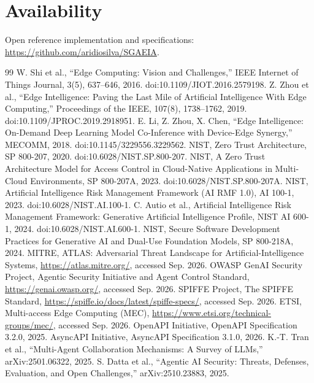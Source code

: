 \documentclass[11pt]{article}
\newcommand{\repo}{\url{https://github.com/aridiosilva/SGAEIA}}
\begin{document}
\section*{Availability}
Open reference implementation and specifications: \repo.
\begin{thebibliography}{99}
 W. Shi et al., ``Edge Computing: Vision and Challenges,'' IEEE Internet of Things Journal, 3(5), 637--646, 2016. doi:10.1109/JIOT.2016.2579198.
 Z. Zhou et al., ``Edge Intelligence: Paving the Last Mile of Artificial Intelligence With Edge Computing,'' Proceedings of the IEEE, 107(8), 1738--1762, 2019. doi:10.1109/JPROC.2019.2918951.
 E. Li, Z. Zhou, X. Chen, ``Edge Intelligence: On-Demand Deep Learning Model Co-Inference with Device-Edge Synergy,'' MECOMM, 2018. doi:10.1145/3229556.3229562.
 NIST, Zero Trust Architecture, SP 800-207, 2020. doi:10.6028/NIST.SP.800-207.
 NIST, A Zero Trust Architecture Model for Access Control in Cloud-Native Applications in Multi-Cloud Environments, SP 800-207A, 2023. doi:10.6028/NIST.SP.800-207A.
 NIST, Artificial Intelligence Risk Management Framework (AI RMF 1.0), AI 100-1, 2023. doi:10.6028/NIST.AI.100-1.
 C. Autio et al., Artificial Intelligence Risk Management Framework: Generative Artificial Intelligence Profile, NIST AI 600-1, 2024. doi:10.6028/NIST.AI.600-1.
 NIST, Secure Software Development Practices for Generative AI and Dual-Use Foundation Models, SP 800-218A, 2024.
 MITRE, ATLAS: Adversarial Threat Landscape for Artificial-Intelligence Systems, \url{https://atlas.mitre.org/}, accessed Sep. 2026.
 OWASP GenAI Security Project, Agentic Security Initiative and Agent Control Standard, \url{https://genai.owasp.org/}, accessed Sep. 2026.
 SPIFFE Project, The SPIFFE Standard, \url{https://spiffe.io/docs/latest/spiffe-specs/}, accessed Sep. 2026.
 ETSI, Multi-access Edge Computing (MEC), \url{https://www.etsi.org/technical-groups/mec/}, accessed Sep. 2026.
 OpenAPI Initiative, OpenAPI Specification 3.2.0, 2025.
 AsyncAPI Initiative, AsyncAPI Specification 3.1.0, 2026.
 K.-T. Tran et al., ``Multi-Agent Collaboration Mechanisms: A Survey of LLMs,'' arXiv:2501.06322, 2025.
 S. Datta et al., ``Agentic AI Security: Threats, Defenses, Evaluation, and Open Challenges,'' arXiv:2510.23883, 2025.
\end{thebibliography}
\end{document}
